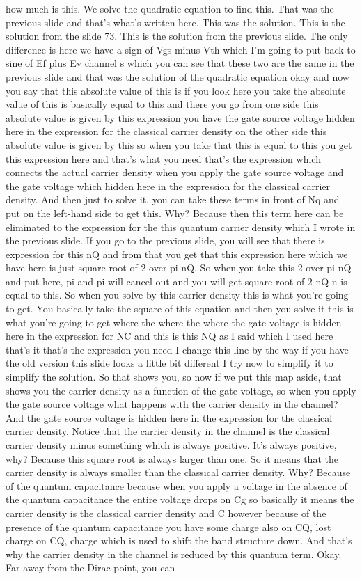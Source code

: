 how much is this. We solve the quadratic equation to find this. That was the previous slide and that's what's written here. This was the solution. This is the solution from the slide 73. This is the solution from the previous slide. The only difference is here we have a sign of Vgs minus Vth which I'm going to put back to sine of Ef plus Ev channel s which you can see that these two are the same in the previous slide and that was the solution of the quadratic equation okay and now you say that this absolute value of this is if you look here you take the absolute value of this is basically equal to this and there you go from one side this absolute value is given by this expression you have the gate source voltage hidden here in the expression for the classical carrier density on the other side this absolute value is given by this so when you take that this is equal to this you get this expression here and that's what you need that's the expression which connects the actual carrier density when you apply the gate source voltage and the gate voltage which hidden here in the expression for the classical carrier density. And then just to solve it, you can take these terms in front of Nq and put on the left-hand side to get this. Why? Because then this term here can be eliminated to the expression for the this quantum carrier density which I wrote in the previous slide. If you go to the previous slide, you will see that there is expression for this nQ and from that you get that this expression here which we have here is just square root of 2 over pi nQ. So when you take this 2 over pi nQ and put here, pi and pi will cancel out and you will get square root of 2 nQ n is equal to this. So when you solve by this carrier density this is what you're going to get. You basically take the square of this equation and then you solve it this is what you're going to get where the where the where the gate voltage is hidden here in the expression for NC and this is this NQ as I said which I used here that's it that's the expression you need I change this line by the way if you have the old version this slide looks a little bit different I try now to simplify it to simplify the solution. So that shows you, so now if we put this map aside, that shows you the carrier density as a function of the gate voltage, so when you apply the gate source voltage what happens with the carrier density in the channel? And the gate source voltage is hidden here in the expression for the classical carrier density. Notice that the carrier density in the channel is the classical carrier density minus something which is always positive. It's always positive, why? Because this square root is always larger than one. So it means that the carrier density is always smaller than the classical carrier density. Why? Because of the quantum capacitance because when you apply a voltage in the absence of the quantum capacitance the entire voltage drops on Cg so basically it means the carrier density is the classical carrier density and C however because of the presence of the quantum capacitance you have some charge also on CQ, lost charge on CQ, charge which is used to shift the band structure down. And that's why the carrier density in the channel is reduced by this quantum term. Okay. Far away from the Dirac point, you can 